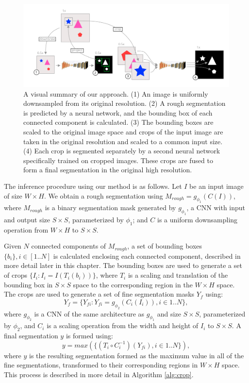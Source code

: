 \begin{figure}[b!]
\centering
\includegraphics[width=\textwidth]{images/5/explainer-diagram.png}
\caption{A visual summary of our approach. (1) An image is uniformly downsampled from its original resolution. (2) A rough segmentation is predicted by a neural network, and the bounding box of each connected component is calculated. (3) The bounding boxes are scaled to the original image space and crops of the input image are taken in the original resolution and scaled to a common input size. (4) Each crop is segmented separately by a second neural network specifically trained on cropped images. These crops are fused to form a final segmentation in the original high resolution. \cite{bencevicSegmentthenSegmentContextPreservingCropBased2023a}\label{fig:summary}}
\end{figure}

The inference procedure using our method is as follows. Let $I$ be an input image of size $W \times H$. We obtain a rough segmentation using $M_{rough} = g_{\phi_1}(C(I))$, where $M_{rough}$ is a binary segmentation mask generated by $g_{\phi_1}$, a CNN with input and output size $S \times S$, parameterized by $\phi_1$; and $C$ is a uniform downsampling operation from  $W \times H$ to $S \times S$. 

Given $N$ connected components of $M_{rough}$, a set of bounding boxes $\{b_i\}, i \in [1..N]$ is calculated enclosing each connected component, described in more detail later in this chapter. The bounding boxes are used to generate a set of crops $\{I_i: I_i = I(T_i(b_i))\}$, where $T_i$ is a scaling and translation of the bounding box in $S \times S$ space to the corresponding region in the $W \times H$ space.
The crops are used to generate a set of fine segmentation masks $Y_f$ using:
\begin{equation}
Y_f = \{Y_{fi}: Y_{fi} = g_{\phi_2}(C_i(I_i)), i \in 1..N\},
\end{equation}
where $g_{\phi_2}$ is a CNN of the same architecture as $g_{\phi_1}$ and size $S \times S$, parameterized by $\phi_2$, and $C_i$ is a scaling operation from the width and height of $I_i$ to $S \times S$. A final segmentation $y$ is formed using:
\begin{equation}
y = max(\{(T_i \circ C^{-1}_i)(Y_{fi}), i \in 1..N\}),
\end{equation}
where $y$ is the resulting segmentation formed as the maximum value in all of the fine segmentations, transformed to their corresponding regions in $W \times H$ space. This process is described in more detail in Algorithm \ref{alg:crop}. 


